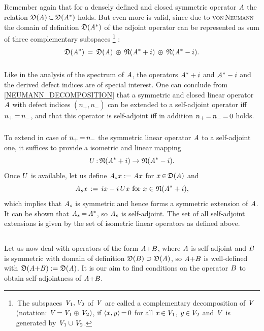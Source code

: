 \documentclass[11pt,twoside]{article}
\begin{document}
\subparagraph{}
Remember again
that for a densely defined and closed symmetric operator $\mathit{A}$
the relation $\mathfrak{D}(\mathit{A}) {\,\subset\,} \mathfrak{D}(\mathit{A}^*)$ holds.
But even more is valid,
since due to \textsc{von\,Neumann} 
the domain of definition $\mathfrak{D}(\mathit{A}^*)$ of the adjoint operator
can be represented as sum of three complementary subspaces \footnote{
\,The subspaces $\mathit{V}_1,\mathit{V}_2$ of $\mathit{V}$
are called a complementary decomposition of $\mathit{V}$
(notation: $\mathit{V} {\,=\,} \mathit{V}_1 \oplus \mathit{V}_2)$,
if $\langle x,y \rangle {\,=\,} 0$ for all $x {\,\in\,} \mathit{V}_1$, $y {\,\in\,} \mathit{V}_2$
and $\mathit{V}$ is generated by $\mathit{V}_1 \cup \mathit{V}_2$.}
:
\begin{equation}\label{NEUMANN_DECOMPOSITION}
\mathfrak{D}(\mathit{A}^*) \,=\, \mathfrak{D}(\mathit{A}) \, \oplus \, \mathfrak{N}(\mathit{A}^*+i)
                                   \, \oplus \, \mathfrak{N}(\mathit{A}^*-i).
\end{equation}

\subparagraph{}
Like in the analysis of the spectrum of $\mathit{A}$,
the operators $\mathit{A}^*+i$ and $\mathit{A}^*-i$ and the derived defect indices
are of special interest.
One can conclude from \eqref{NEUMANN_DECOMPOSITION}
that a symmetric and closed linear operator $\mathit{A}$
with defect indices $(n_+,n_-)$ can be extended to a self-adjoint operator
iff $n_+ {\,=\,} n_-$,
and that this operator is self-adjoint
iff in addition $n_+ {\,=\,} n_- {\,=\,} 0$ holds.

\subparagraph{}
To extend in case of $n_+ {\,=\,} n_-$ the symmetric linear operator $\mathit{A}$
to a self-adjoint one,
it suffices to provide a isometric and linear mapping
\[
{U} {\,:\,} \mathfrak{N}(\mathit{A}^*+i) \to \mathfrak{N}(\mathit{A}^*-i).
\]
Once ${U}$ is available,
let us define $\mathit{A}_s x := \mathit{A} x$ for $x {\,\in\,} \mathfrak{D}(\mathit{A})$ and
\[
\mathit{A}_s x \,:=\, ix - i \, {U} x \mbox{ for } x \in \mathfrak{N}(\mathit{A}^* + i),
\]
which implies that
$\mathit{A}_s$ is symmetric and hence forms a symmetric extension of $\mathit{A}$.
It can be shown that $\mathit{A}_s {\,=\,} \mathit{A}^*$,
so $\mathit{A}_s$ is self-adjoint.
The set of all self-adjoint extensions is given
by the set of isometric linear operators as defined above.

\subsection{} %
Let us now deal with operators of the form $\mathit{A} {+}{B}$,
where $\mathit{A}$ is self-adjoint and ${B}$ is symmetric
with domain of definition $\mathfrak{D}({B}) \supset \mathfrak{D}(\mathit{A})$,
so $\mathit{A} {+} {B}$ is well-defined
with $\mathfrak{D}(\mathit{A} {+} {B}) := \mathfrak{D}(\mathit{A})$.
It is our aim to find
conditions on the operator ${B}$
to obtain self-adjointness of $\mathit{A} {+} {B}$.
\end{document}
